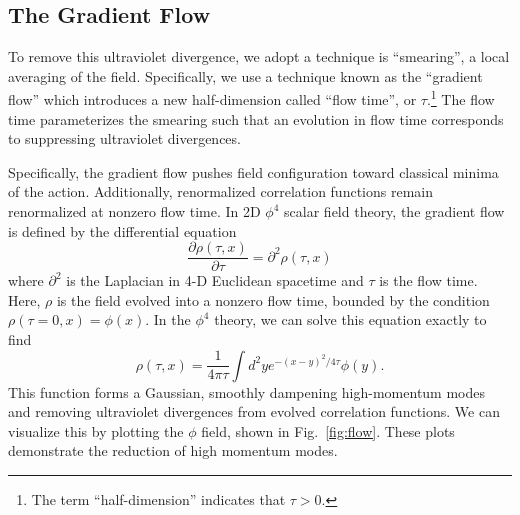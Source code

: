 \documentclass[12pt]{report}
\begin{document}
\subsection{The Gradient Flow}
\label{sec:gradflow}
To remove this ultraviolet divergence, we adopt a technique is ``smearing'', a local averaging of the field.\cite{solbrig2007} Specifically, we use a technique known as the ``gradient flow'' \cite{monahan2015} which introduces a new half-dimension called ``flow time'', or $\tau$.\footnote{The term ``half-dimension'' indicates that $\tau>0$.}  The flow time parameterizes the smearing such that an evolution in flow time corresponds to suppressing ultraviolet divergences. 

Specifically, the gradient flow pushes field configuration toward classical minima of the action. Additionally, renormalized correlation functions remain renormalized at nonzero flow time.\cite{luscher2013} In 2D $\phi^4$ scalar field theory, the gradient flow is defined by the differential equation 
\begin{equation}
    \frac{\partial \rho(\tau, x)}{\partial \tau} = \partial^2 \rho(\tau,x)
\end{equation}
where $\partial^2$ is the Laplacian in 4-D Euclidean spacetime and $\tau$ is the flow time. Here, $\rho$ is the field evolved into a nonzero flow time, bounded by the condition $\rho(\tau=0,x) = \phi(x)$. In the $\phi^4$ theory, we can solve this equation exactly to find \cite{monahan2016}
\begin{equation}
    \rho(\tau, x) = \frac{1}{4 \pi \tau} \int d^2 y e^{-(x-y)^2/4\tau} \phi(y).
\end{equation}
This function forms a Gaussian, smoothly dampening high-momentum modes and removing ultraviolet divergences from evolved correlation functions.\cite{makino2015a} We can visualize this by plotting the $\phi$ field, shown in Fig.~\ref{fig:flow}. These plots demonstrate the reduction of high momentum modes.
\end{document}

